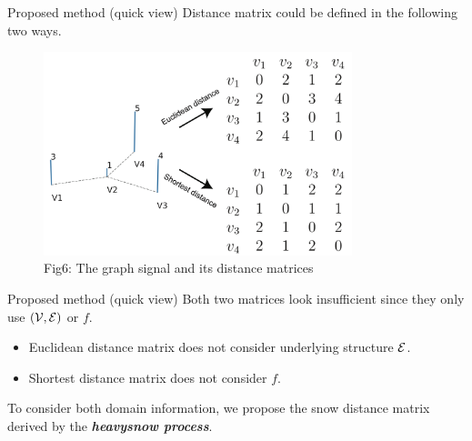 \documentclass[
  ignorenonframetext,
]{beamer}
\providecommand{\tightlist}{%
  \setlength{\itemsep}{0pt}\setlength{\parskip}{0pt}}\usepackage{longtable,booktabs,array}
\begin{document}
\begin{frame}{Proposed method (quick view)}
\label{proposed-method-quick-view-1}
Distance matrix could be defined in the following two ways.

\begin{figure}[H]

{\centering \includegraphics[width=0.8\textwidth,height=\textheight]{Beamer_files/figure-beamer/030e8263-46d1-4379-85b2-e3b509cc9119-1-39a1acd1-26dc-4cf6-91cd-fded8b949c72.png}

}

\caption{Fig6: The graph signal and its distance matrices}

\end{figure}%
\end{frame}

\begin{frame}{Proposed method (quick view)}
\label{proposed-method-quick-view-2}
Both two matrices look insufficient since they only use
\(({\cal V}, {\cal E})\) or \(f\).

\begin{itemize}
\tightlist
\item
  Euclidean distance matrix does not consider underlying structure
  \({\cal E}\).
\item
  Shortest distance matrix does not consider \(f\).
\end{itemize}

To consider both domain information, we propose the snow distance matrix
derived by the \textbf{\emph{heavysnow process}}.
\end{frame}
\end{document}
